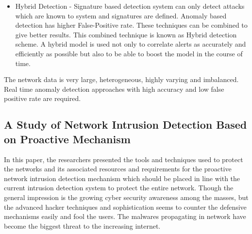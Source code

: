 \documentclass[11pt]{article}
\begin{document}
\begin{itemize}
		\item Hybrid Detection - Signature based detection system can only detect attacks which are known to system and signatures are defined. Anomaly based detection has higher False-Positive rate. These techniques can be combined to give better results. This combined technique is known as Hybrid detection scheme. A hybrid model is used not only to correlate alerts as accurately and efficiently as possible but also to be able to boost the model in the course of time.
	\end{itemize}
The network data is very large, heterogeneous, highly varying and imbalanced. Real time anomaly detection approaches with high accuracy and low false positive rate are required.
	
	\subsection{A Study of Network Intrusion Detection Based on Proactive Mechanism}
	In this paper, the researchers presented the tools and techniques used to protect the networks and its associated resources and requirements for the proactive network intrusion detection mechanism which should be placed in line with the current intrusion detection system to protect the entire network. Though the general impression is the growing cyber security awareness among the masses, but the advanced hacker techniques and sophistication seems to counter the defensive mechanisms easily and fool the users. The malwares propagating in network have become the biggest threat to the increasing internet. \\ \\
\end{document}
